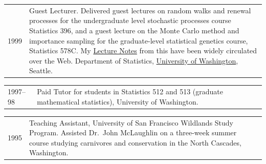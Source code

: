 \documentclass[11pt]{article}
\newlength{\myindent}
\newlength{\postskip}
\newlength{\scndcol}
\begin{document}
\begin{tabular}{ @{}p{2.5\myindent} p{\scndcol}@{}  }

\hspace*{\myindent}1999 & Guest Lecturer. Delivered guest lectures on random walks and renewal
processes for the undergraduate level stochastic processes course Statistics 396, and a guest lecture
on the Monte Carlo method and importance sampling for the graduate-level statistical genetics course,
Statistics 578C.  My \href{http://ib.berkeley.edu/labs/slatkin/eriq/classes/guest_lect/mc_lecture_notes.pdf}{Lecture Notes} from this have been widely circulated over the Web.   Department of Statistics, \href{http://www.washington.edu/}{University of Washington}, Seattle.
\end{tabular}

\begin{tabular}{ @{}p{2.5\myindent} p{\scndcol}@{}  }
\hspace*{\myindent}1997--98 &  Paid Tutor for students in Statistics 512 and 513 (graduate mathematical
statistics), University of Washington.
\end{tabular}

\begin{tabular}{ @{}p{2.5\myindent} p{\scndcol}@{}  }
\hspace*{\myindent}1995 & Teaching Assistant, University of San Francisco Wildlands Study
Program. Assisted Dr.~John McLaughlin on a three-week summer course studying carnivores and conservation
in  the North Cascades, Washington. \\
\end{tabular}
\vspace*{\postskip}
\end{document}
